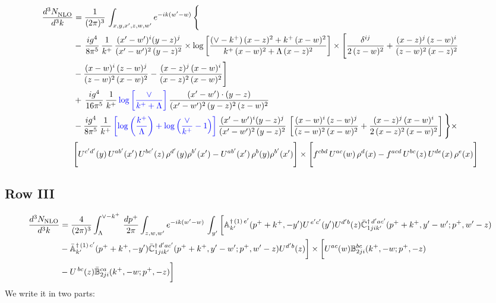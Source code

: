 \documentclass[9pt]{article}
\def\mf#1{\mathbb{#1}}
\numberwithin{equation}{section}
\begin{document}
\begin{align}
     \frac{d^{3}N_{\rm NLO}^{\rm}}{d^{3}k}  & =  \frac{1}{(2\pi)^{3}}\, \int_{x,y,x',z,w,w^{\prime}} e^{-ik(w^{\prime}-w)}\, \Bigg\{\notag \\ & -\,\frac{ig^{4}}{8\pi^{5}}\,\frac{1}{k^{+}}\,\frac{(x'-w')^{i}(y-z)^{j}}{(x'-w')^{2}\,(y-z)^{2}}\times \log{\left[\frac{(\vee-k^{+})\,(x-z)^{2}+k^{+}\,(x-w)^{2}}{k^{+}\,(x-w)^{2}+\Lambda\, (x-z)^{2}}\right]}\times \Bigg[\frac{\delta^{ij}}{2\,(z-w)^{2}}+\frac{(x-z)^{j}\,(z-w)^{i}}{(z-w)^{2}\,(x-z)^{2}}\notag \\ & -\frac{(x-w)^{i}\,(z-w)^{j}}{(z-w)^{2}\,(x-w)^{2}}-\frac{(x-z)^{j}\,(x-w)^{i}}{(x-z)^{2}\,(x-w)^{2}}\Bigg]\notag \\ & +\,\frac{ig^{4}}{16\pi^{5}}\,\frac{1}{k^{+}}\,{\color{blue}\log{\left[\frac{\vee}{k^{+}+\Lambda}\right]}}\, \frac{(x'-w')\cdot (y-z)}{(x'-w')^{2}\,(y-z)^{2}\,(z-w)^{2}}\notag \\ & -\frac{ig^{4}}{8\pi^{5}}\,\frac{1}{k^{+}}\,{\color{blue}\left[\log{\left(\frac{k^{+}}{\Lambda}\right)}+\log{\left(\frac{\vee}{k^{+}}-1\right)}\right]}\,\frac{(x'-w')^{i}(y-z)^{j}}{(x'-w')^{2}\,(y-z)^{2}}\,\left[\frac{(x-w)^{i}\,(z-w)^{j}}{(z-w)^{2}\,(x-w)^{2}}+\frac{(x-z)^{j}\,(x-w)^{i}}{2\,(x-z)^{2}\, (x-w)^{2}}\right]\Bigg\}\times \notag \\ & \Bigg[U^{c'd'}(y)\,U^{ab'}(x')\,U^{bc'}(z)\,\rho^{d'}(y)\rho^{b'}(x')-U^{ab'}(x')\,\rho^{b}(y)\rho^{b'}(x')\Bigg]\times\Bigg[f^{cbd}\,U^{ac}(w)\,\rho^{d}(x)-f^{acd}\, U^{bc}(z)\,U^{de}(x)\,\rho^{e}(x)\Bigg]
\end{align}
 \subsection{Row III\,}
 \begin{align}
    \frac{d^{3}N_{\rm NLO}}{d^{3}k} & =   \frac{4}{(2\pi)^{3}} \int_{\Lambda}^{\vee -k^{+}}\, \frac{dp^{+}}{2\pi}\int_{z,w,w^{\prime}} e^{-ik(w^{\prime}-w)}\,\int_{y^{\prime}}\bigg[\mf{A}^{\dagger\, (1)\,e^{\prime}}_{k^{\prime}}(p^{+}+k^{+},-y^{\prime})U^{\, e^{\prime}c^{\prime}}(y^{\prime})U^{d^{\prime}b}(z) \Bar{\mf{C}}^{\dagger\, d^{\prime}ac^{\prime}}_{1jik^{\prime}}(p^{+}+k^{+},y^{\prime}-w^{\prime}; p^{+},w^{\prime}-z)\notag \\ &  -\Bar{\mf{A}}^{\dagger\, (1)\,c^{\prime}}_{k^{\prime}}(p^{+}+k^{+},-y^{\prime}) \Bar{\mf{C}}^{\dagger\, d^{\prime}ac^{\prime}}_{1jik^{\prime}}(p^{+}+k^{+},y^{\prime}-w^{\prime}; p^{+},w^{\prime}-z)U^{d^{\prime}b}(z)\bigg] \times \bigg[U^{ac}(w) \mf{B}^{bc}_{2ji}(k^{+},-w;p^{+},-z)\notag \\ &  -U^{\, bc}(z)\Bar{\mf{B}}^{ca}_{2ji}(k^{+},-w; p^{+},-z)\bigg]\nonumber
\end{align}
We write it in two parts:
\end{document}
